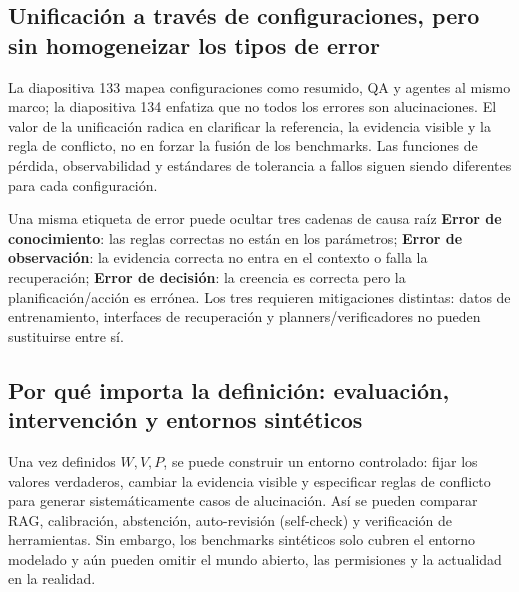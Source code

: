 \subsection{Unificación a través de configuraciones, pero sin homogeneizar los tipos de error}

La diapositiva 133 mapea configuraciones como resumido, QA y agentes al mismo marco; la diapositiva 134 enfatiza que no todos los errores son alucinaciones. El valor de la unificación radica en clarificar la referencia, la evidencia visible y la regla de conflicto, no en forzar la fusión de los benchmarks. Las funciones de pérdida, observabilidad y estándares de tolerancia a fallos siguen siendo diferentes para cada configuración.



\begin{warningbox}{Una misma etiqueta de error puede ocultar tres cadenas de causa raíz}
\textbf{Error de conocimiento}: las reglas correctas no están en los parámetros; \textbf{Error de observación}: la evidencia correcta no entra en el contexto o falla la recuperación; \textbf{Error de decisión}: la creencia es correcta pero la planificación/acción es errónea. Los tres requieren mitigaciones distintas: datos de entrenamiento, interfaces de recuperación y planners/verificadores no pueden sustituirse entre sí.
\end{warningbox}

\subsection{Por qué importa la definición: evaluación, intervención y entornos sintéticos}

Una vez definidos $W, V, P$, se puede construir un entorno controlado: fijar los valores verdaderos, cambiar la evidencia visible y especificar reglas de conflicto para generar sistemáticamente casos de alucinación. Así se pueden comparar RAG, calibración, abstención, auto-revisión (self-check) y verificación de herramientas. Sin embargo, los benchmarks sintéticos solo cubren el entorno modelado y aún pueden omitir el mundo abierto, las permisiones y la actualidad en la realidad.

